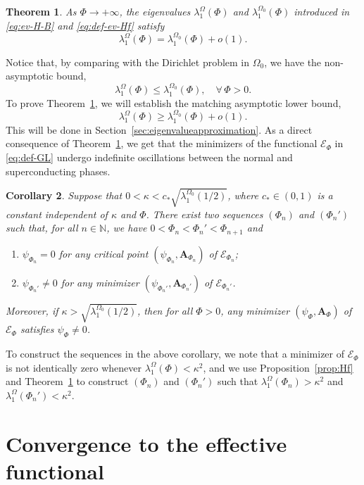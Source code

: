 \documentclass[11pt]{amsart}
\newcommand{\N}{\mathbb N}
\newcommand{\Ab}{\mathbf A}
\newcommand{\Ef}{\mathcal E_\Phi}
\newcommand{\cE}{\mathcal E}
\newtheorem{theorem}{Theorem}[section]
\newtheorem{corollary}[theorem]{Corollary}
\theoremstyle{definition}
\numberwithin{equation}{section}
\begin{document}
%
\begin{theorem}\label{thm:ev}
As $\Phi\to+\infty$, the eigenvalues $\lambda_1^{\Omega}(\Phi)$ and $\lambda_1^{\Omega_0}(\Phi)$ introduced in \eqref{eq:ev-H-B} and \eqref{eq:def-ev-Hf} satisfy
\[
    \lambda_1^{\Omega}(\Phi) = \lambda_1^{\Omega_0}(\Phi) + o(1).
\]
\end{theorem}
%
Notice that, by comparing with the Dirichlet problem in $\Omega_0$, we have the non-asymptotic bound,
\begin{equation}\label{eq:comparison}
\lambda_1^{\Omega}(\Phi)\leq \lambda_1^{\Omega_0}(\Phi),\quad \forall\, \Phi>0.
\end{equation}
%
To prove Theorem~\ref{thm:ev}, we will establish the matching asymptotic lower bound,
\begin{equation}\label{eq:comparison*}
\lambda_1^{\Omega}(\Phi)\geq \lambda_1^{\Omega_0}(\Phi)+o(1).
\end{equation}
%
This will be done in Section~\ref{sec:eigenvalueapproximation}. As a direct consequence of Theorem~\ref{thm:ev}, we get that the minimizers of the functional $\Ef$ in \eqref{eq:def-GL} undergo indefinite oscillations between the normal and superconducting phases.
%
\begin{corollary}\label{cor:oscillations2}
Suppose that $0<\kappa<c_*\sqrt{\lambda_1^{\Omega_0}(1/2)}$, where $c_*\in(0,1)$ is a constant independent of $\kappa$ and $\Phi$. There exist two sequences $(\Phi_n)$ and $(\Phi_n')$ such that, for all $n\in \N$, we have $0<\Phi_n<\Phi_n'<\Phi_{n+1}$ and
\begin{enumerate}[\rm i)]
\item $\psi_{\Phi_n}=0$ for any critical point $(\psi_{\Phi_n},\Ab_{\Phi_n})$ of $\cE_{\Phi_n}$;
\item $\psi_{\Phi_n'}\not=0$ for any minimizer $(\psi_{\Phi_n'},\Ab_{\Phi_n'})$ of $\cE_{\Phi_n'}$.
\end{enumerate}
Moreover, if $\kappa>\sqrt{\lambda_1^{\Omega_0}(1/2)}$, then for all $\Phi>0$, any minimizer $(\psi_\Phi,\Ab_\Phi)$ of $\Ef$ satisfies $\psi_\Phi\not=0$.
\end{corollary}
%
To construct the sequences in the above corollary, we note that a minimizer of $\Ef$ is not identically zero whenever $\lambda_1^\Omega(\Phi)<\kappa^2$, and we use Proposition~\ref{prop:Hf} and Theorem~\ref{thm:ev} to construct $(\Phi_n)$ and $(\Phi_n')$ such that $\lambda_1^\Omega(\Phi_n)>\kappa^2$ and $\lambda_1^{\Omega}(\Phi_n')<\kappa^2$.

\section{Convergence to the effective functional}\label{sec:funcconv}
\end{document}
